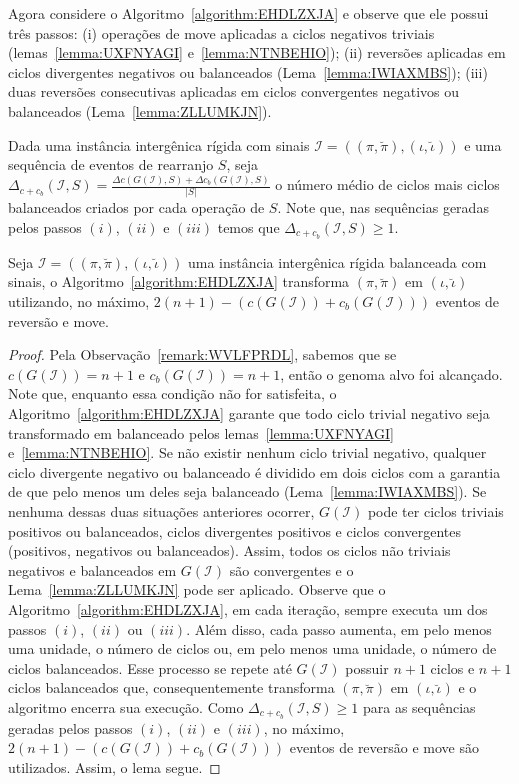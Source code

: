 Agora considere o Algoritmo~\ref{algorithm:EHDLZXJA} e observe que ele possui três passos: (i) operações de move aplicadas a ciclos negativos triviais (lemas~\ref{lemma:UXFNYAGI} e~\ref{lemma:NTNBEHIO}); (ii) reversões aplicadas em ciclos divergentes negativos ou balanceados (Lema~\ref{lemma:IWIAXMBS}); (iii) duas reversões consecutivas aplicadas em ciclos convergentes negativos ou balanceados (Lema~\ref{lemma:ZLLUMKJN}).



Dada uma instância intergênica rígida com sinais $\mathcal{I}=((\pi,\breve\pi),(\iota,\breve\iota))$ e uma sequência de eventos de rearranjo $S$, seja $\Delta_{c+c_b} (\mathcal{I},S) = \frac{\Delta c(G(\mathcal{I}),S) + \Delta c_b(G(\mathcal{I}),S)}{|S|}$ o número médio de ciclos mais ciclos balanceados criados por cada operação de $S$. Note que, nas sequências geradas pelos passos $(i)$, $(ii)$ e $(iii)$ temos que $\Delta_{c+c_b}(\mathcal{I},S) \ge 1$.

\begin{lemma}\label{lemma:APHTXLZC}
Seja $\mathcal{I} = ((\pi,\breve\pi),(\iota,\breve\iota))$ uma instância intergênica rígida balanceada com sinais, o Algoritmo~\ref{algorithm:EHDLZXJA} transforma $(\pi,\breve\pi)$ em $(\iota,\breve\iota)$ utilizando, no máximo, $2(n + 1) - (c(G(\mathcal{I})) + c_b(G(\mathcal{I})))$ eventos de reversão e move.
\end{lemma}
\begin{proof}
Pela Observação~\ref{remark:WVLFPRDL}, sabemos que se $c(G(\mathcal{I})) = {n + 1}$ e $c_b(G(\mathcal{I})) = {n + 1}$, então o genoma alvo foi alcançado. Note que, enquanto essa condição não for satisfeita, o Algoritmo~\ref{algorithm:EHDLZXJA} garante que todo ciclo trivial negativo seja transformado em balanceado pelos lemas~\ref{lemma:UXFNYAGI} e~\ref{lemma:NTNBEHIO}. Se não existir nenhum ciclo trivial negativo, qualquer ciclo divergente negativo ou balanceado é dividido em dois ciclos com a garantia de que pelo menos um deles seja balanceado (Lema~\ref{lemma:IWIAXMBS}). Se nenhuma dessas duas situações anteriores ocorrer, $G(\mathcal{I})$ pode ter ciclos triviais positivos ou balanceados, ciclos divergentes positivos e ciclos convergentes (positivos, negativos ou balanceados). Assim, todos os ciclos não triviais negativos e balanceados em $G(\mathcal{I})$ são convergentes e o Lema~\ref{lemma:ZLLUMKJN} pode ser aplicado. Observe que o Algoritmo~\ref{algorithm:EHDLZXJA}, em cada iteração, sempre executa um dos passos $(i)$, $(ii)$ ou $(iii)$. Além disso, cada passo aumenta, em pelo menos uma unidade, o número de ciclos ou, em pelo menos uma unidade, o número de ciclos balanceados. Esse processo se repete até $G(\mathcal{I})$ possuir ${n+1}$ ciclos e ${n+1}$ ciclos balanceados que, consequentemente transforma $(\pi, \breve\pi)$ em $(\iota,\breve\iota)$ e o algoritmo encerra sua execução.  Como $\Delta_{c+c_b}(\mathcal{I},S) \ge 1$ para as sequências geradas pelos passos $(i)$, $(ii)$ e $(iii)$, no máximo, $2(n + 1) - (c(G(\mathcal{I})) + c_b(G(\mathcal{I})))$ eventos de reversão e move são utilizados. Assim, o lema segue.
\end{proof}

